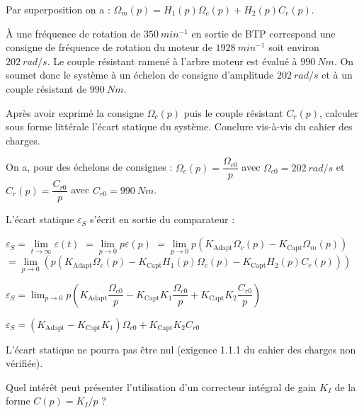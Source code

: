 \begin{corrige}

Par superposition on a : $\Omega_m (p)=H_1 (p) \Omega_c (p)+H_2 (p) C_r (p)$.
\end{corrige}
\else
\fi


À une fréquence de rotation de $\SI{350}{min^{-1}}$ en sortie de BTP correspond une consigne de fréquence de rotation du moteur de $\SI{1 928}{min^{-1}}$ soit environ $\SI{202}{rad/s}$. Le couple résistant ramené à l'arbre moteur est évalué à $\SI{990}{Nm}$. On soumet donc le système à un échelon de consigne d'amplitude $\SI{202}{rad/s}$ et à un couple résistant de $\SI{990}{Nm}$.

\begin{question}
Après avoir exprimé la consigne  $\Omega_c (p)$ puis le couple résistant $C_r (p)$, calculer sous forme littérale l'écart statique du système. Conclure vis-à-vis du cahier des charges.
\end{question}

\ifprof
\begin{corrige}

On a, pour des échelons de consignes :
$\Omega_c (p)=\dfrac{\Omega_{c0}}{p}$	avec $\Omega_{c0}=\SI{202}{rad/s}$	et	$C_r (p)=\dfrac{C_{r0}}{p}$	avec $C_{r0}=\SI{990}{N m}$.

L’écart statique $\varepsilon_S$  s’écrit en sortie du comparateur :

$\varepsilon_S= \lim\limits_{t\to \infty} \varepsilon(t)$  
$=\lim\limits_{p\to 0} p \varepsilon(p)$
$=\lim\limits_{p\to0} p (K_{\text{Adapt}}\Omega_c (p)-K_{\text{Capt}} \Omega_m (p))$
$=\lim\limits_{p\to 0}  \left(p (K_{\text{Adapt}} \Omega_c (p)-K_{\text{Capt}} H_1 (p) \Omega_c (p)-K_{\text{Capt}} H_2 (p) C_r (p))\right)$

$\varepsilon_S=\lim_{p\to 0}  p \left(K_{\text{Adapt}} \dfrac{\Omega_{c0}}{p}-K_{\text{Capt}} K_1 \dfrac{\Omega_{c0}}{p}+K_{\text{Capt}} K_2 \dfrac{C_{r0}}{p}\right)$

$\varepsilon_S=\left(K_{\text{Adapt}}-K_{\text{Capt}} K_1 \right)\Omega_{c0}+ K_{\text{Capt}} K_2C_{r0}$

L’écart statique ne pourra pas être nul (exigence 1.1.1 du cahier des charges non vérifiée).


\end{corrige}
\else
\fi


\begin{question}
Quel intérêt peut présenter l'utilisation d'un correcteur intégral de gain $K_I$ de la forme $C(p)=K_I/p$ ?
\end{question}

